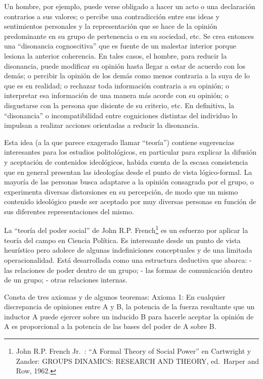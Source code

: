 \documentclass[
]{book}
\begin{document}
Un hombre, por ejemplo, puede verse obligado a hacer un acto o una declaración contrarios a sus valores; o percibe una contradicción entre sus ideas y sentimientos personales y la representación que se hace de la opinión predominante en su grupo de pertenencia o en su sociedad, etc. Se crea entonces una ``disonancia cognoscitiva'' que es fuente de un malestar interior porque lesiona la anterior coherencia. En tales casos, el hombre, para reducir la disonancia, puede modificar su opinión hasta llegar a estar de acuerdo con los demás; o percibir la opinión de los demás como menos contraria a la suya de lo que es en realidad; o rechazar toda información contraria a su opinión; o interpretar esa información de una manera más acorde con su opinión; o disgustarse con la persona que disiente de su criterio, etc. En definitiva, la ``disonancia'' o incompatibilidad entre cogniciones distintas del individuo lo impulsan a realizar acciones orientadas a reducir la disonancia.

Esta idea (a la que parece exagerado llamar ``teoría'') contiene sugerencias interesantes para los estudios politológicos, en particular para explicar la difusión y aceptación de contenidos ideológicos, habida cuenta de la escasa consistencia que en general presentan las ideologías desde el punto de vista lógico-formal. La mayoría de las personas busca adaptarse a la opinión consagrada por el grupo, o experimenta diversas distorsiones en su percepción, de modo que un mismo contenido ideológico puede ser aceptado por muy diversas personas en función de sus diferentes representaciones del mismo.

La ``teoría del poder social'' de John R.P. French\footnote{John R.P. French Jr.~: ``A Formal Theory of Social Power'' en Cartwright y Zander: GROUPS DINAMICS: RESEARCH AND THEORY, ed.~Harper and Row, 1962.} es un esfuerzo por aplicar la teoría del campo en Ciencia Política. Es interesante desde un punto de vista heurístico pero adolece de algunas indefiniciones conceptuales y de una limitada operacionalidad. Está desarrollada como una estructura deductiva que abarca: - las relaciones de poder dentro de un grupo; - las formas de comunicación dentro de un grupo; - otras relaciones internas.

Consta de tres axiomas y de algunos teoremas: Axioma 1: En cualquier discrepancia de opiniones entre A y B, la potencia de la fuerza resultante que un inductor A puede ejercer sobre un inducido B para hacerle aceptar la opinión de A es proporcional a la potencia de las bases del poder de A sobre B.
\end{document}
